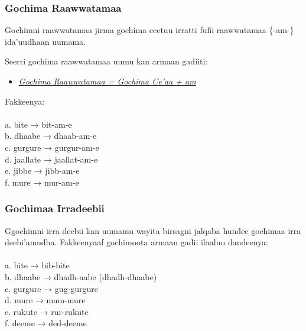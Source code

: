 \documentclass[11pt,b5paper]{book}
\begin{document}
\subsubsection{Gochima Raawwatamaa}
Gochimni raawwatamaa jirma gochima ceetuu irratti fufii raawwatamaa \{-am-\} ida’uudhaan uumama.

Seerri gochima raawwatamaa uumu kan armaan gadiiti:
\begin{itemize}
	\item \textit{\underline{Gochima Raawwatamaa = Gochima Ce’aa + am}} 
\end{itemize}

Fakkeenya:\\
\\
a. bite → bit-am-e \\
b. dhaabe → dhaab-am-e\\
c. gurgure → gurgur-am-e \\
d. jaallate → jaallat-am-e \\
e. jibbe → jibb-am-e \\ 
f. mure → mur-am-e \\

\subsubsection{Gochimaa Irradeebii}
Ggochimni irra deebii kan uumamu wayita birsagni jalqaba hundee gochimaa irra deebi'amudha. Fakkeenyaaf gochimoota armaan gadii ilaaluu dandeenya:\\
\\
a. bite → bib-bite\\
b. dhaabe → dhadh-aabe (dhadh-dhaabe)\\
c. gurgure → gug-gurgure\\
d. mure → mum-mure\\
e. rukute → rur-rukute\\
f. deeme → ded-deeme 
\end{document}

